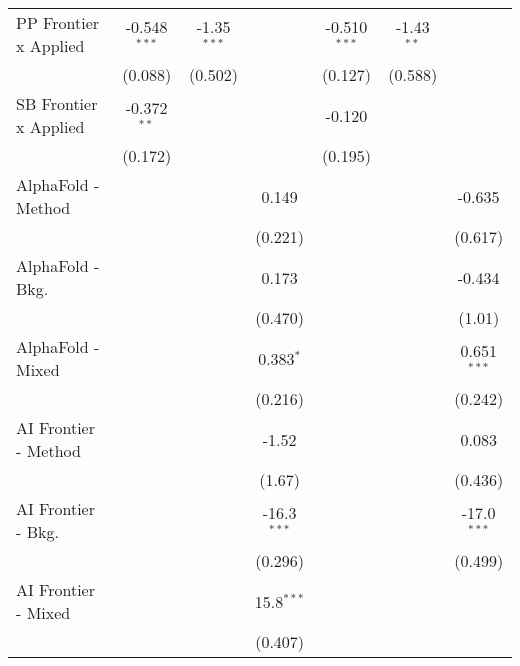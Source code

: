 \begin{tabular}{lcccccc}
   PP Frontier x Applied          & -0.548$^{***}$ & -1.35$^{***}$ &               & -0.510$^{***}$ & -1.43$^{**}$  &   \\   
                                  & (0.088)        & (0.502)       &               & (0.127)        & (0.588)       &   \\   
   SB Frontier x Applied          & -0.372$^{**}$  &               &               & -0.120         &               &   \\   
                                  & (0.172)        &               &               & (0.195)        &               &   \\   
   AlphaFold - Method             &                &               & 0.149         &                &               & -0.635\\   
                                  &                &               & (0.221)       &                &               & (0.617)\\   
   AlphaFold - Bkg.               &                &               & 0.173         &                &               & -0.434\\   
                                  &                &               & (0.470)       &                &               & (1.01)\\   
   AlphaFold - Mixed              &                &               & 0.383$^{*}$   &                &               & 0.651$^{***}$\\   
                                  &                &               & (0.216)       &                &               & (0.242)\\   
   AI Frontier - Method           &                &               & -1.52         &                &               & 0.083\\   
                                  &                &               & (1.67)        &                &               & (0.436)\\   
   AI Frontier - Bkg.             &                &               & -16.3$^{***}$ &                &               & -17.0$^{***}$\\   
                                  &                &               & (0.296)       &                &               & (0.499)\\   
   AI Frontier - Mixed            &                &               & 15.8$^{***}$  &                &               &   \\   
                                  &                &               & (0.407)       &                &               &   \\   

\end{tabular}
